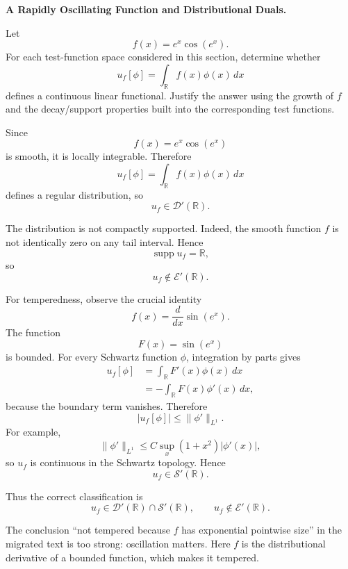 \begin{problem}[CP-II-0180]
\label{prob:cp-ii-0180}
\textbf{A Rapidly Oscillating Function and Distributional Duals.}

\hspace*{1.5em}Let
\[
f(x)=e^x\cos(e^x).
\]
For each test-function space considered in this section, determine whether
\[
u_f[\phi]=\int_{\mathbb R}f(x)\phi(x)\,dx
\]
defines a continuous linear functional. Justify the answer using the growth of
\(f\) and the decay/support properties built into the corresponding test
functions.
\end{problem}

\begin{solution}
Since
\[
f(x)=e^x\cos(e^x)
\]
is smooth, it is locally integrable. Therefore
\[
u_f[\phi]
=
\int_{\mathbb R}f(x)\phi(x)\,dx
\]
defines a regular distribution, so
\[
\boxed{u_f\in\mathcal D'(\mathbb R).}
\]

The distribution is not compactly supported. Indeed, the smooth function \(f\) is not identically zero on any tail interval. Hence
\[
\operatorname{supp}u_f=\mathbb R,
\]
so
\[
\boxed{u_f\notin\mathcal E'(\mathbb R).}
\]

For temperedness, observe the crucial identity
\[
f(x)
=
\frac{d}{dx}\sin(e^x).
\]
The function
\[
F(x)=\sin(e^x)
\]
is bounded. For every Schwartz function \(\phi\), integration by parts gives
\[
\begin{aligned}
u_f[\phi]
&=
\int_{\mathbb R}F'(x)\phi(x)\,dx\\
&=
-\int_{\mathbb R}F(x)\phi'(x)\,dx,
\end{aligned}
\]
because the boundary term vanishes. Therefore
\[
|u_f[\phi]|
\le
\|\phi'\|_{L^1}.
\]
For example,
\[
\|\phi'\|_{L^1}
\le
C\sup_x(1+x^2)|\phi'(x)|,
\]
so \(u_f\) is continuous in the Schwartz topology. Hence
\[
\boxed{u_f\in\mathcal S'(\mathbb R).}
\]

Thus the correct classification is
\[
\boxed{
u_f\in\mathcal D'(\mathbb R)\cap\mathcal S'(\mathbb R),
\qquad
u_f\notin\mathcal E'(\mathbb R).
}
\]

The conclusion ``not tempered because \(f\) has exponential pointwise size'' in the migrated text is too strong: oscillation matters. Here \(f\) is the distributional derivative of a bounded function, which makes it tempered.
\end{solution}


